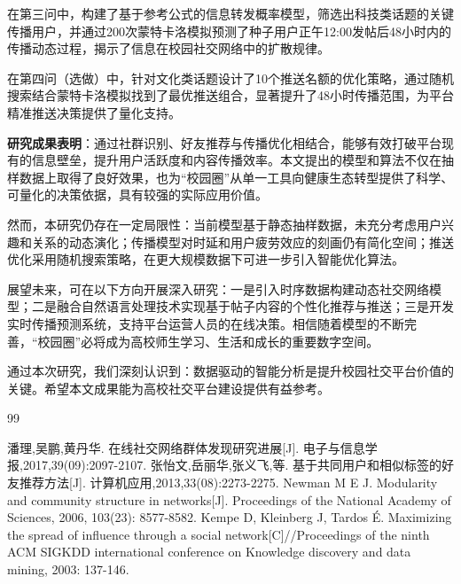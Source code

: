 \documentclass[a4paper,12pt]{ctexart}
\begin{document}
在第三问中，构建了基于参考公式的信息转发概率模型，筛选出科技类话题的关键传播用户，并通过200次蒙特卡洛模拟预测了种子用户正午12:00发帖后48小时内的传播动态过程，揭示了信息在校园社交网络中的扩散规律。

在第四问（选做）中，针对文化类话题设计了10个推送名额的优化策略，通过随机搜索结合蒙特卡洛模拟找到了最优推送组合，显著提升了48小时传播范围，为平台精准推送决策提供了量化支持。

\textbf{研究成果表明}：通过社群识别、好友推荐与传播优化相结合，能够有效打破平台现有的信息壁垒，提升用户活跃度和内容传播效率。本文提出的模型和算法不仅在抽样数据上取得了良好效果，也为“校园圈”从单一工具向健康生态转型提供了科学、可量化的决策依据，具有较强的实际应用价值。

然而，本研究仍存在一定局限性：当前模型基于静态抽样数据，未充分考虑用户兴趣和关系的动态演化；传播模型对时延和用户疲劳效应的刻画仍有简化空间；推送优化采用随机搜索策略，在更大规模数据下可进一步引入智能优化算法。

展望未来，可在以下方向开展深入研究：一是引入时序数据构建动态社交网络模型；二是融合自然语言处理技术实现基于帖子内容的个性化推荐与推送；三是开发实时传播预测系统，支持平台运营人员的在线决策。相信随着模型的不断完善，“校园圈”必将成为高校师生学习、生活和成长的重要数字空间。

通过本次研究，我们深刻认识到：数据驱动的智能分析是提升校园社交平台价值的关键。希望本文成果能为高校社交平台建设提供有益参考。


\newpage %

\begin{thebibliography}{99}
\setmainfont{Cambria} %

 潘理,吴鹏,黄丹华. 在线社交网络群体发现研究进展[J]. 电子与信息学报,2017,39(09):2097-2107.
 张怡文,岳丽华,张义飞,等. 基于共同用户和相似标签的好友推荐方法[J]. 计算机应用,2013,33(08):2273-2275.
 Newman M E J. Modularity and community structure in networks[J]. Proceedings of the National Academy of Sciences, 2006, 103(23): 8577-8582.
 Kempe D, Kleinberg J, Tardos É. Maximizing the spread of influence through a social network[C]//Proceedings of the ninth ACM SIGKDD international conference on Knowledge discovery and data mining, 2003: 137-146.

\end{thebibliography}


\newpage %
\appendix
\end{document}

